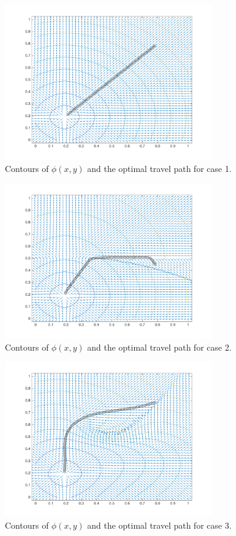 \documentclass[10pt]{article}
\begin{document}
\begin{figure}[H]
\centering
\includegraphics[width=0.8\textwidth]{figures/case1.png}
\caption{Contours of \(\phi(x, y)\) and the optimal travel path for case 1.}
\label{fig:case1}
\end{figure}

\begin{figure}[H]
\centering
\includegraphics[width=0.8\textwidth]{figures/case2.png}
\caption{Contours of \(\phi(x, y)\) and the optimal travel path for case 2.}
\label{fig:case2}
\end{figure}

\begin{figure}[H]
\centering
\includegraphics[width=0.8\textwidth]{figures/case3.png}
\caption{Contours of \(\phi(x, y)\) and the optimal travel path for case 3.}
\label{fig:case3}
\end{figure}
\end{document}
